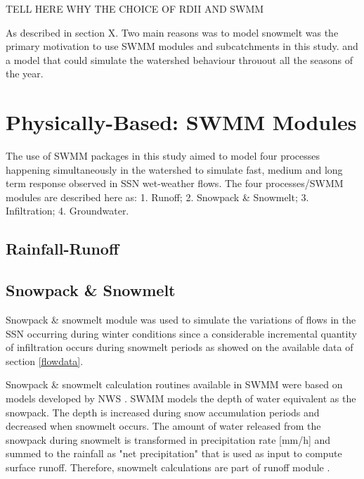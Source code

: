 TELL HERE WHY THE CHOICE OF RDII AND SWMM

As described in section X. Two main reasons was to model snowmelt was the primary motivation to use SWMM modules and subcatchments in this study. and a model that could simulate the watershed behaviour throuout all the seasons of the year. 

\section{Physically-Based: SWMM Modules}

The use of SWMM packages in this study aimed to model four processes happening simultaneously in the watershed to simulate fast, medium and long term response observed in \ac{SSN} wet-weather flows. The four processes/SWMM modules are described here as: 1. Runoff; 2. Snowpack \& Snowmelt; 3. Infiltration; 4. Groundwater. 


\subsection{Rainfall-Runoff} 


\subsection{Snowpack \& Snowmelt} \label{snowlit}

Snowpack \& snowmelt module was used to simulate the variations of flows in the \acf{SSN} occurring during winter conditions since a considerable incremental quantity of infiltration occurs during snowmelt periods as showed on the available data of section \ref{flowdata}.

Snowpack \& snowmelt calculation routines available in SWMM were based on models developed by \acf{NWS} \cite{anderson1973,anderson2006}. SWMM models the depth of water equivalent as the snowpack. The depth is increased during snow accumulation periods and decreased when snowmelt occurs. The amount of water released from the snowpack during snowmelt is transformed in precipitation rate [mm/h] and summed to the rainfall as "net precipitation" that is used as input to compute surface runoff. Therefore, snowmelt calculations are part of runoff module \cite{Rossman2016}.

